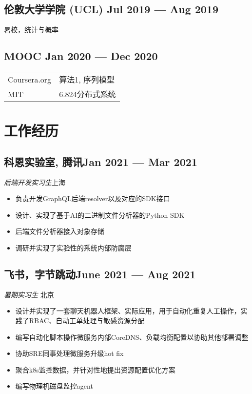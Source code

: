 \documentclass[a4,12pt]{article}
\newcommand{\subtext}[1]{
#1\par\vspace{-0.3cm}}
\newenvironment{zitemize}{
\begin{itemize}\itemsep0pt \parskip0pt \parsep1pt}
{\end{itemize}\vspace{-0.5cm}}
\begin{document}
\vspace{-0.3cm}
\subsection*{伦敦大学学院 (UCL) \hfill \textbf{Jul 2019 --- Aug 2019}}
暑校，统计与概率

\vspace{-0.3cm}
\subsection*{MOOC \hfill \textbf{Jan 2020 --- Dec 2020}}
\begin{tabular}{p{10em} p{21em}}
Coursera.org     & 算法1, 序列模型 \\
MIT     & 6.824分布式系统
\end{tabular}


\vspace{-0.6cm}
\section{\textbf{工作经历}}

\vspace{-0.3cm}
\subsection*{科恩实验室, 腾讯\hfill Jan 2021 --- Mar 2021} 
\subtext{\textit{后端开发实习生}\hfill 上海} 
    \begin{zitemize}
        \item 负责开发GraphQL后端resolver以及对应的SDK接口
        \item 设计、实现了基于AI的二进制文件分析器的Python SDK
        \item 后端文件分析器接入对象存储
        \item 调研并实现了实验性的系统内部防腐层
    \end{zitemize}


\vspace{-0.3cm}
\subsection*{飞书，字节跳动\hfill June 2021 --- Aug 2021} 
\subtext{\textit{暑期实习生} \hfill 北京} 
    \begin{zitemize}
        \item 设计并实现了一套聊天机器人框架、实际应用，用于自动化重复人工操作，实践了RBAC、自动工单处理与敏感资源分配
        \item 编写自动化脚本操作微服务内部CoreDNS、负载均衡配置以协助其他部署调整
        \item 协助SRE同事处理微服务升级hot fix
        \item 聚合k8s监控数据，并针对性地提出资源配置优化方案
        \item 编写物理机磁盘监控agent
    \end{zitemize}
\end{document}
